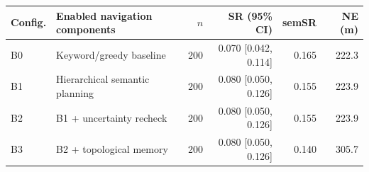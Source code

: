 \begin{tabularx}{\linewidth}{@{}l>{\raggedright\arraybackslash}Xrrrr@{}}
\toprule
Config. & Enabled navigation components & $n$ & SR (95\% CI) & semSR & NE (m) \\
\midrule
B0 & Keyword/greedy baseline & 200 & 0.070 [0.042, 0.114] & 0.165 & 222.3 \\
B1 & Hierarchical semantic planning & 200 & 0.080 [0.050, 0.126] & 0.155 & 223.9 \\
B2 & B1 + uncertainty recheck & 200 & 0.080 [0.050, 0.126] & 0.155 & 223.9 \\
B3 & B2 + topological memory & 200 & 0.080 [0.050, 0.126] & 0.140 & 305.7 \\
\bottomrule
\end{tabularx}
